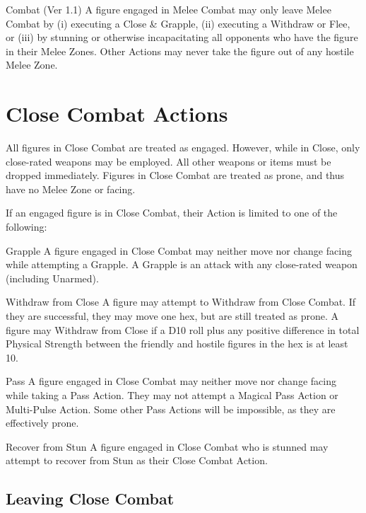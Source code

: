 \begin{Chapter}{Combat (Ver 1.1)}
A figure engaged in Melee Combat may only leave Melee Combat by (i)
executing a Close \& Grapple, (ii) executing a Withdraw or Flee, or
(iii) by stunning or otherwise incapacitating all opponents who have
the figure in their Melee Zones.  Other Actions may never take the
figure out of any hostile Melee Zone.

\section{Close Combat Actions}

All figures in Close Combat are treated as engaged.  However, while in
Close, only close-rated weapons may be employed. All other weapons or
items must be dropped immediately. Figures in Close Combat are treated
as prone, and thus have no Melee Zone or facing.

If an engaged figure is in Close Combat, their Action is limited to
one of the following:

\begin{Description}

\item[Grapple] A figure engaged in Close Combat may neither move nor
  change facing while attempting a Grapple.  A Grapple is an attack
  with any close-rated weapon (including Unarmed).

\item[Withdraw from Close] A figure may attempt to Withdraw from Close
  Combat. If they are successful, they may move one hex, but are still
  treated as prone.  A figure may Withdraw from Close if a D10 roll
  plus any positive difference in total Physical Strength between the
  friendly and hostile figures in the hex is at least 10.

\item[Pass] A figure engaged in Close Combat may neither move nor
  change facing while taking a Pass Action.  They may not attempt a
  Magical Pass Action or Multi-Pulse Action.  Some other Pass Actions
  will be impossible, as they are effectively prone.

\item[Recover from Stun] A figure engaged in Close Combat who is
  stunned may attempt to recover from Stun as their Close Combat
  Action.

\end{Description}

\subsection{Leaving Close Combat}


\end{Chapter}
